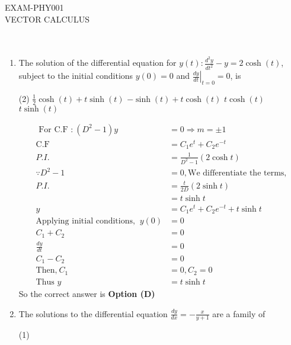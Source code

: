 \begin{abox}
	EXAM-PHY001\\ \vspace{0.6cm}
VECTOR CALCULUS
\end{abox}

\section*{}
$\left. \right.$ {}
\begin{enumerate}[label=\color{ocre}\textbf{\arabic*.}]

\item The solution of the differential equation for $y(t): \frac{d^{2} y}{d t^{2}}-y=2 \cosh (t)$, subject to the initial conditions $y(0)=0$ and $\left.\frac{d y}{d t}\right|_{t=0}=0$, is
	{}
\begin{tasks}(2)
	\task[\textbf{A.}] $\frac{1}{2} \cosh (t)+t \sinh (t)$
	\task[\textbf{B.}] $-\sinh (t)+t \cosh (t)$
	\task[\textbf{C.}] $t \cosh (t)$
	\task[\textbf{D.}] $t \sinh (t)$
\end{tasks}
\begin{answer}
	$$
	\begin{aligned}
	\text{	For C.F :} \ \left(D^{2}-1\right) y&=0 \Rightarrow m=\pm 1 \\ \text{C.F }&=C_{1} e^{t}+C_{2} e^{-t}\\
	P.I. &=\frac{1}{D^{2}-1}(2 \cosh t)\\ \because D^{2}-1&=0,  \text{We differentiate the terms,}\\
	P.I.&=\frac{t}{2D}(2 \sinh t)\\
	&=t \sinh t\\
	y&=C_{1} e^{t}+C_{2} e^{-t}+t \sinh t\\
	\text{Applying initial conditions, }\ y(0)&=0 \\ C_{1}+C_{2}&=0\\
	\frac{d y}{d t}&=0\\ C_{1}-C_{2}&=0\\
	\text{Then,}\ C_{1}&=0, C_{2}=0\\
	\text{Thus }y&=t \sinh t
	\end{aligned}
	$$
	So the correct answer is \textbf{Option (D)}
\end{answer}
\item The solutions to the differential equation $\frac{d y}{d x}=-\frac{x}{y+1}$ are a family of
{}
\begin{tasks}(1)

\end{tasks}
\end{enumerate}
